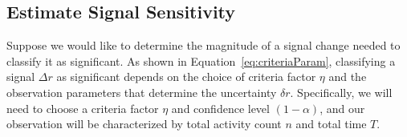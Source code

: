 \documentclass{article}
\begin{document}
%
%
%



\subsection{Estimate Signal Sensitivity}
\label{ex:3}

Suppose we would like to determine the magnitude of a signal change needed to 
classify it as significant. 
As shown in Equation~\ref{eq:criteriaParam}, 
classifying a signal $\Delta r$ as significant depends on the choice of criteria factor 
$\eta$ and the observation parameters that determine the uncertainty $\delta r$. 
Specifically, we will need to choose a criteria factor $\eta$ and confidence level 
$(1-\alpha)$, and our observation will be characterized by total activity count $n$ 
and total time $T$.
\end{document}
